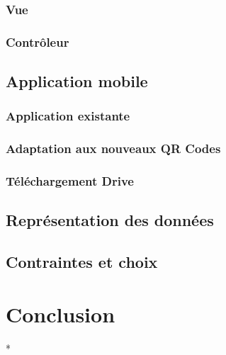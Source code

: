\documentclass{report}
\begin{document}
		\subsection{Vue}
			
				
		\subsection{Contrôleur}
			

	\section{Application mobile}
		
		\subsection{Application existante}
			
		
		\subsection{Adaptation aux nouveaux QR Codes}
			
		
		\subsection{Téléchargement Drive}
			
			
	\section{Représentation des données}
		
		
	\section{Contraintes et choix}
	
		
		


\chapter{Conclusion}
	

*
\end{document}
